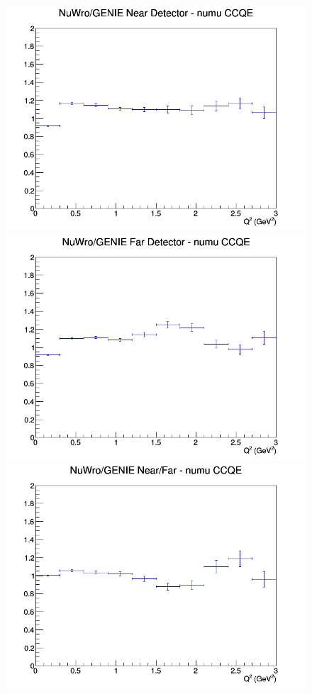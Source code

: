 \documentclass[12pt]{article}
\begin{document}
\begin{figure}[h]
\endminipage
\newline
{}
\includegraphics[width=\linewidth]{eff_Q2/FGT/ratios/CCQE_NuWro_GENIE_numu_near_Q2.png}
\endminipage
{}
\includegraphics[width=\linewidth]{eff_Q2/FGT/ratios/CCQE_NuWro_GENIE_numu_far_Q2.png}
\endminipage
{}
\includegraphics[width=\linewidth]{eff_Q2/FGT/ratios/CCQE_NuWro_GENIE_numu_NF_Q2.png}
\endminipage
\newline
\end{figure}
\clearpage
\end{document}
